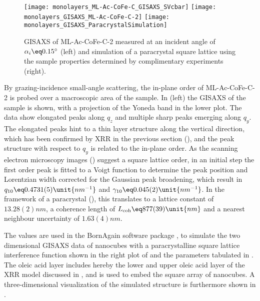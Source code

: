 \documentclass[\main/dresen_thesis.tex]{subfiles}
\begin{document}
  \label{sec:monolayers:structure:squareArrayParacrystalGISAXS}
  \begin{figure}[tb]
    \centering
    \texttt{[image: monolayers\_ML-Ac-CoFe-C\_GISAXS\_SVcbar]}
    \texttt{[image: monolayers\_GISAXS\_ML-Ac-CoFe-C-2]}
    \texttt{[image: monolayers\_GISAXS\_ParacrystalSimulation]}
    \caption{\label{fig:monolayers:structure:ML-Ac-CoFe-C-2:GISAXS}GISAXS of ML-Ac-CoFe-C-2 measured at an incident angle of $\alpha_i \eq 0.15^\circ$ (left) and simulation of a paracrystal square lattice using the sample properties determined by complimentary experiments (right).}
  \end{figure}
  By grazing-incidence small-angle scattering, the in-plane order of ML-Ac-CoFe-C-2 is probed over a macroscopic area of the sample.
  In  (left) the GISAXS of the sample is shown, with a projection of  the Yoneda band in the lower plot.
  The data show elongated peaks along $\mathit{q_z}$ and multiple sharp peaks emerging along $\mathit{q_y}$.
  The elongated peaks hint to a thin layer structure along the vertical direction, which has been confirmed by XRR in the previous section (), and the peak structure with respect to $\mathit{q_y}$ is related to the in-plane order.
  As the scanning electron microscopy images () suggest a square lattice order, in an initial step the first order peak is fitted to a Voigt function to determine the peak position and Lorentzian width corrected for the Gaussian peak broadening,  which result in $q_{10} \eq 0.4731(5) \unit{nm^{-1}}$ and $\gamma_{10} \eq 0.045(2) \unit{nm^{-1}}$.
  In the framework of a paracrystal (), this translates to a lattice constant of $13.28(2) \unit{nm}$, a coherence length of $L_{\mathrm{coh}} \eq 877(39) \unit{nm}$ and a nearest neighbour uncertainty of $1.63(4) \unit{nm}$.

  The values are used in the BornAgain software package \cite{Burle_2018_borna}, to simulate the two dimensional GISAXS data of nanocubes with a paracrystalline square lattice interference function shown in the right plot of  and the parameters tabulated in .
  The oleic acid layer includes hereby the lower and upper oleic acid layer of the XRR model discussed in , and is used to embed the square array of nanocubes.
  A three-dimensional visualization of the simulated structure is furthermore shown in .
\end{document}
